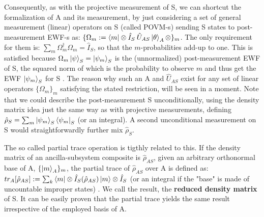 \documentclass[11pt, a4paper]{article} %
\begin{document}
Consequently, as with the projective measurement of S, we can shortcut the formalization of A and its measurement, by just considering a set of general measurement (linear) operators on S (called POVM-s) sending S states to post-measurement EWF-s as: $\{\Omega_m:=\bra{m}\otimes\hat{I}_S\:\hat{U}_{AS}\ket{\theta}_A\otimes\}_m$. The only requirement for them is: $\sum_m \Omega_m^\dagger\Omega_m=\hat{I}_S$, so that the $m$-probabilities add-up to one. This is satisfied because $\Omega_m\ket{\psi}_S=\ket{\psi_m}_S$ is the (unnormalized) post-measurement EWF of S, the squared norm of which is the probability to observe $m$ and thus get the EWF $\ket{\psi_m}_S$ for S \cite{Generalized, Durr}. The reason why such an A and $\hat{U}_{AS}$  exist for any set of linear operators $\{\Omega_m\}_m$ satisfying the stated restriction, will be seen in a moment. Note that we could describe the post-measurement S unconditionally, using the density matrix idea just the same way as with projective measurements, defining $\hat{\rho}_S=\sum_m \ket{\psi_m}_S\bra{\psi_m}_S$ (or an integral). A second unconditional measurement on S would straightforwardly further mix $\hat{\rho}_S$.

The so called partial trace operation is tigthly related to this. If the density matrix of an ancilla-subsystem composite is $\hat{\rho}_{AS}$, given an arbitrary orthonormal base of A, $\{\ket{m}_A\}_m$, the partial trace of $\hat{\rho}_{AS}$ over A is defined as: $tr_{A}[\hat{\rho}_{AS}] := \sum_k \bra{m}\otimes \hat{I}_S(\hat{\rho}_{AS})\ket{m}\otimes \hat{I}_S$ (or an integral if the "base" is made of uncountable improper states) \cite{Generalized, Durr}. We call the result, the {\bf reduced density matrix} of S. It can be easily proven that the partial trace yields the same result irrespective of the employed basis of A.
\end{document}
